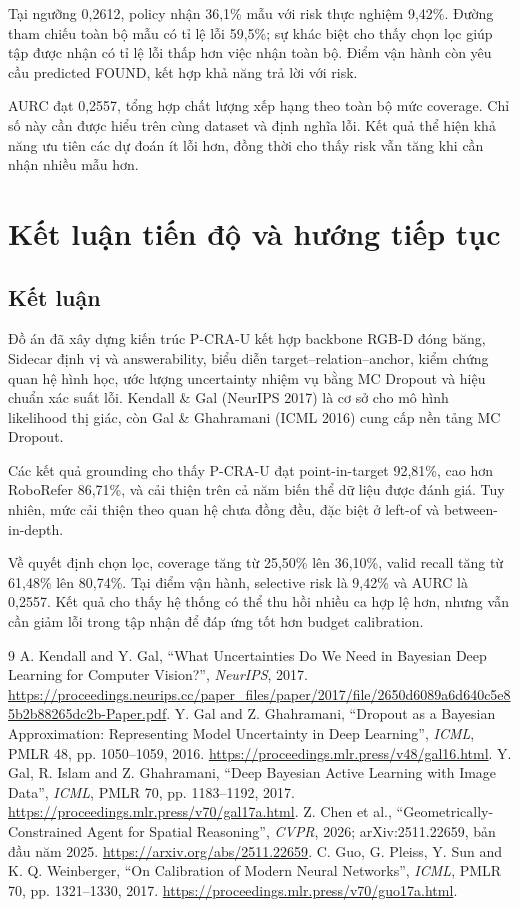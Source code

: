 \documentclass[12pt,a4paper]{article}
\begin{document}
Tại ngưỡng 0,2612, policy nhận 36,1\% mẫu với risk thực nghiệm 9,42\%. Đường tham chiếu toàn bộ mẫu có tỉ lệ lỗi 59,5\%; sự khác biệt cho thấy chọn lọc giúp tập được nhận có tỉ lệ lỗi thấp hơn việc nhận toàn bộ. Điểm vận hành còn yêu cầu predicted FOUND, kết hợp khả năng trả lời với risk.

AURC đạt 0,2557, tổng hợp chất lượng xếp hạng theo toàn bộ mức coverage. Chỉ số này cần được hiểu trên cùng dataset và định nghĩa lỗi. Kết quả thể hiện khả năng ưu tiên các dự đoán ít lỗi hơn, đồng thời cho thấy risk vẫn tăng khi cần nhận nhiều mẫu hơn.

\section{Kết luận tiến độ và hướng tiếp tục}
\subsection{Kết luận}
Đồ án đã xây dựng kiến trúc P-CRA-U kết hợp backbone RGB-D đóng băng, Sidecar định vị và answerability, biểu diễn target--relation--anchor, kiểm chứng quan hệ hình học, ước lượng uncertainty nhiệm vụ bằng MC Dropout và hiệu chuẩn xác suất lỗi. Kendall \& Gal (NeurIPS 2017) là cơ sở cho mô hình likelihood thị giác, còn Gal \& Ghahramani (ICML 2016) cung cấp nền tảng MC Dropout.

Các kết quả grounding cho thấy P-CRA-U đạt point-in-target 92,81\%, cao hơn RoboRefer 86,71\%, và cải thiện trên cả năm biến thể dữ liệu được đánh giá. Tuy nhiên, mức cải thiện theo quan hệ chưa đồng đều, đặc biệt ở left-of và between-in-depth.

Về quyết định chọn lọc, coverage tăng từ 25,50\% lên 36,10\%, valid recall tăng từ 61,48\% lên 80,74\%. Tại điểm vận hành, selective risk là 9,42\% và AURC là 0,2557. Kết quả cho thấy hệ thống có thể thu hồi nhiều ca hợp lệ hơn, nhưng vẫn cần giảm lỗi trong tập nhận để đáp ứng tốt hơn budget calibration.



\clearpage
\begin{thebibliography}{9}
A. Kendall and Y. Gal, ``What Uncertainties Do We Need in Bayesian Deep Learning for Computer Vision?'', \emph{NeurIPS}, 2017.
\url{https://proceedings.neurips.cc/paper_files/paper/2017/file/2650d6089a6d640c5e85b2b88265dc2b-Paper.pdf}.
Y. Gal and Z. Ghahramani, ``Dropout as a Bayesian Approximation: Representing Model Uncertainty in Deep Learning'', \emph{ICML}, PMLR 48, pp. 1050--1059, 2016.
\url{https://proceedings.mlr.press/v48/gal16.html}.
Y. Gal, R. Islam and Z. Ghahramani, ``Deep Bayesian Active Learning with Image Data'', \emph{ICML}, PMLR 70, pp. 1183--1192, 2017.
\url{https://proceedings.mlr.press/v70/gal17a.html}.
Z. Chen et al., ``Geometrically-Constrained Agent for Spatial Reasoning'', \emph{CVPR}, 2026; arXiv:2511.22659, bản đầu năm 2025.
\url{https://arxiv.org/abs/2511.22659}.
C. Guo, G. Pleiss, Y. Sun and K. Q. Weinberger, ``On Calibration of Modern Neural Networks'', \emph{ICML}, PMLR 70, pp. 1321--1330, 2017.
\url{https://proceedings.mlr.press/v70/guo17a.html}.
\end{thebibliography}

\appendix
\end{document}

